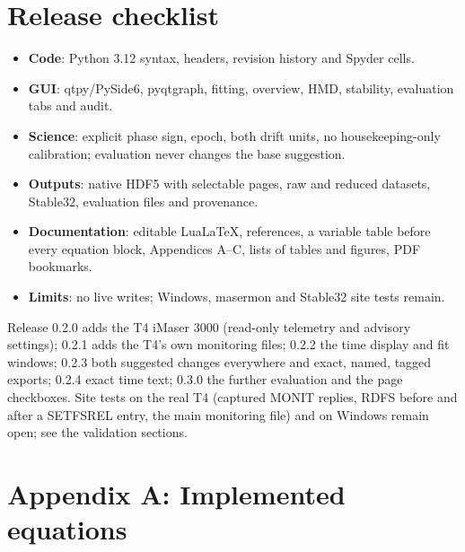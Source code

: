 \documentclass[11pt,a4paper]{article}
\renewcommand{\_}{\usscore\allowbreak}
\begin{document}
\section{Release checklist}
\begin{itemize}
\item \textbf{Code}: Python 3.12 syntax, headers, revision history and Spyder cells.
\item \textbf{GUI}: qtpy/PySide6, pyqtgraph, fitting, overview, HMD, stability, evaluation tabs and audit.
\item \textbf{Science}: explicit phase sign, epoch, both drift units, no housekeeping-only calibration;
evaluation never changes the base suggestion.
\item \textbf{Outputs}: native HDF5 with selectable pages, raw and reduced datasets, Stable32, evaluation
files and provenance.
\item \textbf{Documentation}: editable LuaLaTeX, references, a variable table before every equation block,
Appendices A--C, lists of tables and figures, PDF bookmarks.
\item \textbf{Limits}: no live writes; Windows, masermon and Stable32 site tests remain.
\end{itemize}

Release 0.2.0 adds the T4 iMaser 3000 (read-only telemetry and advisory
settings); 0.2.1 adds the T4's own monitoring files; 0.2.2 the time display and fit windows;
0.2.3 both suggested changes everywhere and exact, named, tagged exports; 0.2.4 exact time text;
0.3.0 the further evaluation and the page checkboxes. Site tests on the real T4
(captured MONIT replies, RDFS before and after a SETFSREL entry, the main
monitoring file) and on Windows remain open; see the validation sections.
\clearpage
\section{Appendix A: Implemented equations}\label{sec:appA}
\end{document}
